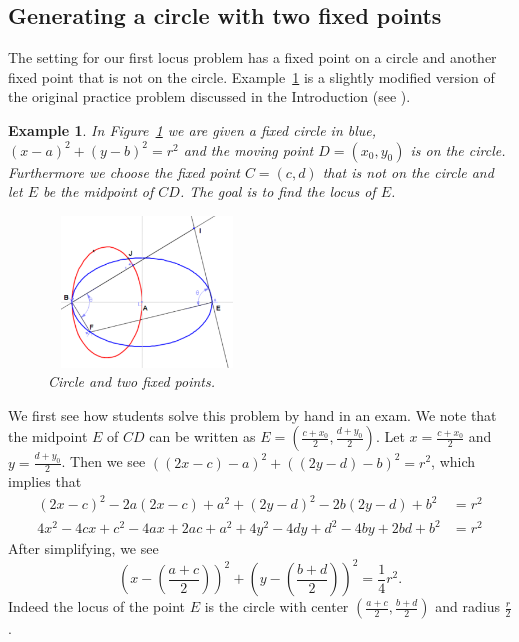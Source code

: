 \documentclass[12pt,a4paper]{article}%
\newtheorem{example}[theorem]{Example}
\begin{document}
\subsection{Generating a circle with two fixed points} \label{ssec2-1}

The setting for our first locus problem has a fixed point on a circle and another
fixed point that is not on the circle. 
Example~\ref{ex1} is a slightly modified version of the original practice problem discussed
in the Introduction
(see \cite{Gao}).

\begin{example} \label{ex1}
In Figure~\ref{fig1} we are given a fixed circle in blue,
$(x-a)^{2}+(y-b)^{2}=r^{2}$ and the moving point $D=(x_{0},y_{0})$
is on the circle. Furthermore we choose the fixed point $C=(c,d)$ that is
not on the circle and let $E$ be the midpoint of $CD$.
The goal is to find the locus of $E$.%
\begin{figure}[htbp]
\begin{center}
 \includegraphics[natheight=2.196700in,natwidth=2.882900in,height=1.5806in,width=2.0684in]{PJH75H1I.pdf}
\end{center}
 \caption{Circle and two fixed points.}
 \label{fig1}
\end{figure}
\end{example}

We first see how students solve this problem by hand in an exam. We note that
the midpoint $E$ of $CD$ can be written as
$E=\left(  \frac{c+x_{0}}{2}, \frac{d+y_{0}}{2}\right)$.
Let $x=\frac{c+x_{0}}{2}$ and $y=\frac{d+y_{0}}{2}$.
Then we see $\left(  \left(  2x-c\right)  -a\right)  ^{2}+\left(\left(  2y-d\right)  -b\right)  ^{2}=r^{2}$,
which implies that
\begin{align*}
\left(  2x-c\right)  ^{2}-2a\left(  2x-c\right)  +a^{2}+\left(  2y-d\right)
^{2}-2b\left(  2y-d\right)  +b^{2}  & =r^{2}\\
4x^{2}-4cx+c^{2}-4ax+2ac+a^{2}+4y^{2}-4dy+d^{2}-4by+2bd+b^{2}  & =r^{2}%
\end{align*}
After simplifying, we see
\[
\left(  x-\left(  \frac{a+c}{2}\right)  \right)  ^{2}+\left(  y-\left(
\frac{b+d}{2}\right)  \right)  ^{2}=\frac{1}{4}r^{2}.
\]
Indeed the locus of the point $E$ is the circle with center $\left(  \frac{a+c}{2},\frac{b+d}{2}\right)$
and radius $\frac{r}{2}$.
\end{document}
